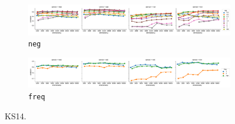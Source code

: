 \begin{figure}
  \centering

  \begin{subfigure}[t]{\textwidth}
    \includegraphics[width=1.1\textwidth]{supplement/figures/ks14-interaction-neg}

  \caption{\texttt{neg}}
  \label{fig:ks14-neg}
  \end{subfigure}

  \begin{subfigure}[t]{\textwidth}
    \includegraphics[width=1.1\textwidth]{supplement/figures/ks14-interaction-freq}

  \caption{\texttt{freq}}
  \label{fig:ks14-freq}
  \end{subfigure}

  \caption{KS14.}
\end{figure}

